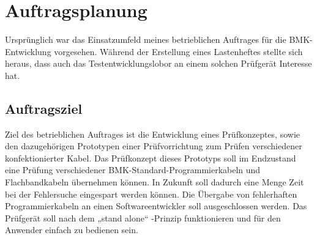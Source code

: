 


\section{Auftragsplanung}


\begin{center}
Ursprünglich war das Einsatzumfeld meines betrieblichen Auftrages für die BMK-Entwicklung vorgesehen. Während der Erstellung eines Lastenheftes stellte sich heraus, dass auch das Testentwicklungslobor an einem solchen Prüfgerät Interesse hat. 
\end{center}



\subsection{Auftragsziel}

Ziel des betrieblichen Auftrages ist die Entwicklung eines Prüfkonzeptes, sowie den dazugehörigen Prototypen einer Prüfvorrichtung zum Prüfen verschiedener konfektionierter Kabel. Das Prüfkonzept dieses Prototyps soll im Endzustand eine Prüfung verschiedener BMK-Standard-Programmierkabeln und Flachbandkabeln übernehmen können. 
In Zukunft soll dadurch eine Menge Zeit bei der Fehlersuche eingespart werden können. Die Übergabe von fehlerhaften Programmierkabeln an einen Softwareentwickler soll ausgeschlossen werden.
Das Prüfgerät soll nach dem „stand alone“ -Prinzip funktionieren und für den Anwender einfach zu bedienen sein.


